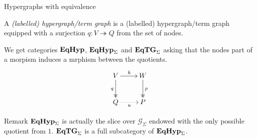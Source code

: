 \documentclass[aspectratio=169]{beamer}
\newcommand{\catname}[1]{\textbf{\textup{#1}}}
\newcommand{\EqHyp}{\catname{EqHyp}} %
\newcommand{\EqHyps}{\catname{EqHyp}_{\Sigma}}
\newcommand{\EqTG}{\catname{EqTG}}
\newcommand{\eto}{\twoheadrightarrow}
\begin{document}
\begin{frame}{Hypergraphs with equivalence}

A \emph{(labelled) hypergraph/term graph} is a (labelled) hypergraph/term graph equipped with a surjection $q\colon V\eto Q$ from the set of nodes. \pause 

We get categories $\EqHyp$, $\EqHyps$ and  $\EqTG_{\Sigma}$ asking that the nodes part of a morpism induces a mrphism between the quotients. 
\[\xymatrix{V \ar@{>>}[d]_{q} \ar[r]^{k}& W \ar@{>>}[d]^p\\ Q \ar@{.>}[r]_{u} & P }\]

\pause 

\begin{block}{Remark}\justifying
$\EqHyps$ is actually the slice over $\mathcal{G}_\Sigma$ endowed with the only possible quotient from $1$. $ \EqTG_{\Sigma}$ is a full subcategory of $\EqHyps$.
\end{block}
\end{frame}
\end{document}
